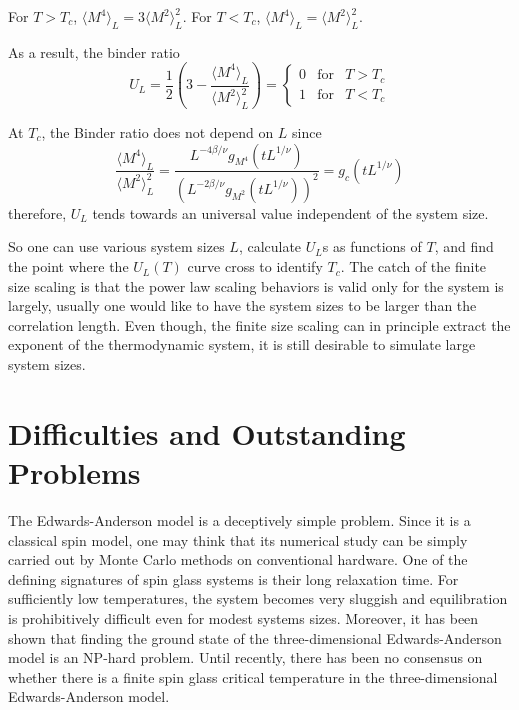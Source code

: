 For $T>T_c$, $\langle M^4\rangle_L = 3 \langle M^2\rangle_L^2$. 
For $T<T_c$, $\langle M^4\rangle_L = \langle M^2\rangle_L^2$.

As a result, the binder ratio
\begin{equation}
  \label{eq:16}
  U_L=\frac{1}{2}\left(3-\frac{\langle M^4\rangle_L}{\langle M^2\rangle^2_L}\right)
  =\left\{
    \begin{array}{ccc}
      0 & \mathrm{for} & T>T_c\\
      1 & \mathrm{for} & T<T_c
    \end{array}
  \right.
\end{equation}

At $T_c$, the Binder ratio does not depend on $L$ since
\begin{equation}
  \label{eq:15}
  \frac{\langle M^4\rangle_L}{\langle M^2\rangle^2_L}
  =\frac{L^{-4\beta/\nu}g_{M^4}(tL^{1/\nu})}{\left(L^{-2\beta/\nu}g_{M^2}(tL^{1/\nu})\right)^2}
  =g_c(tL^{1/\nu})
\end{equation}
therefore, $U_L$ tends towards an universal value independent of the system size.

So one can use various system sizes $L$, calculate $U_L$s as functions of $T$,
and find the point where the $U_L(T)$ curve cross to identify $T_c$. The catch
of the finite size scaling is that the power law scaling behaviors is valid
only for the system is largely, usually one would like to have the system
sizes to be larger than the correlation length. Even though, the finite size
scaling can in principle extract the exponent of the thermodynamic system,
it is still desirable to simulate large system sizes.
  
\section{Difficulties and Outstanding Problems}
The Edwards-Anderson model is a deceptively simple problem. Since it is a classical spin 
model, one may think that its numerical study can be simply carried out by Monte
Carlo methods on conventional hardware. One of the defining signatures of spin glass 
systems is their long relaxation time. 
For sufficiently low temperatures, the system becomes very sluggish and 
equilibration is prohibitively difficult even for modest systems sizes. 
Moreover, it has been shown that finding the ground state of the three-dimensional
Edwards-Anderson model is an NP-hard problem. \cite{Barahona-1982} 
Until recently, there has been no consensus on whether there is a finite spin 
glass critical temperature in the three-dimensional Edwards-Anderson model.

